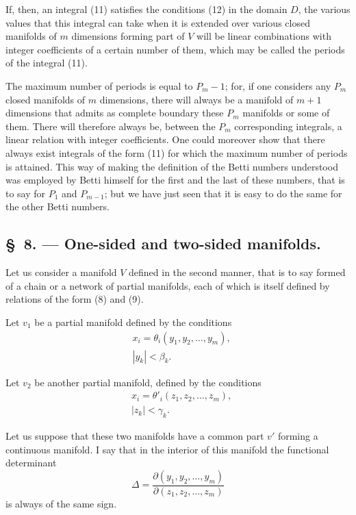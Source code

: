 \documentclass{article}
\begin{document}
If, then, an integral (11) satisfies the conditions (12) in the domain $D$, the various values that this integral can take when it is extended over various closed manifolds of $m$ dimensions forming part of $V$ will be linear combinations with integer coefficients of a certain number of them, which may be called the periods of the integral (11).

The maximum number of periods is equal to $P_{m} - 1$; for, if one considers any $P_{m}$ closed manifolds of $m$ dimensions, there will always be a manifold of $m + 1$ dimensions that admits as complete boundary
these $P_{m}$ manifolds or some of them. There will therefore always be, between the $P_{m}$ corresponding integrals, a linear relation with integer coefficients. One could moreover show that there always exist integrals of the form (11) for which the maximum number of periods is attained. This way of making the definition of the Betti numbers understood was employed by Betti himself for the first and the last of these numbers, that is to say for $P_{1}$ and $P_{m-1}$; but we have just seen that it is easy to do the same for the other Betti numbers.

\subsection*{\S~8. --- One-sided and two-sided manifolds.}

Let us consider a manifold $V$ defined in the second manner, that is to say formed of a chain or a network of partial manifolds, each of which is itself defined by relations of the form (8) and (9).

Let $v_{1}$ be a partial manifold defined by the conditions
\[
\begin{aligned}
&x_{i} = \theta_{i}(y_{1}, y_{2}, \ldots, y_{m}),\\
&|y_{k}| < \beta_{k}.
\end{aligned}
\]

Let $v_{2}$ be another partial manifold, defined by the conditions
\[
\begin{aligned}
&x_{i} = \theta'_{i}(z_{1}, z_{2}, \ldots, z_{m}),\\
&|z_{k}| < \gamma_{k}.
\end{aligned}
\]

Let us suppose that these two manifolds have a common part $v'$ forming a continuous manifold. I say that in the interior of this manifold the functional determinant
\[
\Delta = \frac{\partial(y_{1}, y_{2}, \ldots, y_{m})}{\partial(z_{1}, z_{2}, \ldots, z_{m})}
\]
is always of the same sign.
\end{document}
